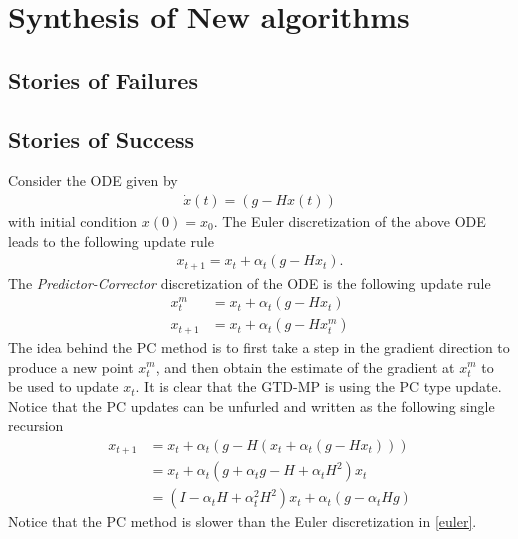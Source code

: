 \section{Synthesis of New algorithms}
\subsection{Stories of Failures}

\subsection{Stories of Success}
Consider the ODE given by
\begin{align}
\dot{x}(t)=(g-Hx(t))
\end{align}
with initial condition $x(0)=x_0$. The Euler discretization of the above ODE leads to the following update rule
\begin{align}\label{euler}
x_{t+1}=x_t+\alpha_t(g-Hx_t).
\end{align}
The \emph{Predictor-Corrector} discretization of the ODE is the following update rule
\begin{align}
x^m_{t}&=x_t+\alpha_t(g-Hx_t)\\
x_{t+1}&=x_t+\alpha_t(g-Hx^m_t)
\end{align} 
The idea behind the PC method is to first take a step in the gradient direction to produce a new point $x^m_t$, and then obtain the estimate of the gradient at $x^m_t$ to be used to update $x_t$. It is clear that the GTD-MP is using the PC type update. Notice that the PC updates can be unfurled and written as the following single recursion
\begin{align}
x_{t+1}&=x_t+\alpha_t(g-H(x_t+\alpha_t(g-Hx_t)))\\
&=x_t+\alpha_t(g+\alpha_t g- H +\alpha_t H^2)x_t \\
&= (I-\alpha_t H+\alpha_t^2 H^2)x_t+\alpha_t(g-\alpha_t H g)
\end{align}
Notice that the PC method is slower than the Euler discretization in \eqref{euler}.
